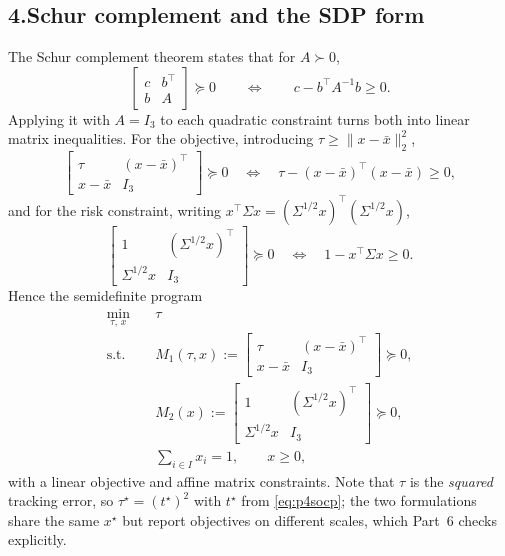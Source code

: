 \documentclass[11pt]{article}
\DeclareMathOperator*{\minimize}{min}
\newcommand{\T}{^{\!\top}}
\theoremstyle{definition}
\begin{document}
\subsection*{4.\quad Schur complement and the SDP form}

The Schur complement theorem states that for $A \succ 0$,
\[
  \begin{bmatrix} c & b\T \\ b & A \end{bmatrix} \succeq 0
  \qquad\Longleftrightarrow\qquad
  c - b\T A^{-1} b \ge 0 .
\]
Applying it with $A = I_3$ to each quadratic constraint turns both into
linear matrix inequalities. For the objective, introducing
$\tau \ge \|x - \bar{x}\|_2^2$,
\[
  \begin{bmatrix} \tau & (x-\bar{x})\T \\ x-\bar{x} & I_3 \end{bmatrix}
  \succeq 0
  \quad\Longleftrightarrow\quad
  \tau - (x-\bar{x})\T(x-\bar{x}) \ge 0 ,
\]
and for the risk constraint, writing
$x\T\Sigma x = (\Sigma^{1/2}x)\T(\Sigma^{1/2}x)$,
\[
  \begin{bmatrix} 1 & (\Sigma^{1/2}x)\T \\ \Sigma^{1/2}x & I_3
  \end{bmatrix} \succeq 0
  \quad\Longleftrightarrow\quad
  1 - x\T \Sigma x \ge 0 .
\]
Hence the semidefinite program
\begin{equation}\label{eq:p4sdp}
\begin{aligned}
  \minimize_{\tau,\,x}\quad & \tau\\
  \text{s.t.}\quad
    & M_1(\tau,x) :=
      \begin{bmatrix} \tau & (x-\bar{x})\T \\ x-\bar{x} & I_3
      \end{bmatrix} \succeq 0,\\
    & M_2(x) :=
      \begin{bmatrix} 1 & (\Sigma^{1/2}x)\T \\ \Sigma^{1/2}x & I_3
      \end{bmatrix} \succeq 0,\\
    & \textstyle\sum_{i \in I} x_i = 1, \qquad x \ge 0 ,
\end{aligned}
\end{equation}
with a linear objective and affine matrix constraints. Note that
$\tau$ is the \emph{squared} tracking error, so
$\tau^\star = (t^\star)^2$ with $t^\star$ from \eqref{eq:p4socp}; the
two formulations share the same $x^\star$ but report objectives on
different scales, which Part~6 checks explicitly.
\end{document}
